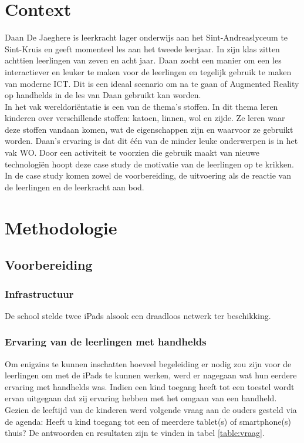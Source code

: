 \documentclass[pdftex,a4paper,12pt,twoside]{report}
\begin{document}
 \section{Context}

Daan De Jaeghere is leerkracht lager onderwijs aan het Sint-Andreaslyceum te Sint-Kruis en geeft momenteel les aan het tweede leerjaar. In zijn klas zitten achttien leerlingen van zeven en acht jaar. Daan zocht een manier om een les interactiever en leuker te maken voor de leerlingen en tegelijk gebruik te maken van moderne ICT. Dit is een ideaal scenario om na te gaan of Augmented Reality op handhelds in de les van Daan gebruikt kan worden. \\

In het vak wereldori\"entatie is een van de thema's stoffen. In dit thema leren kinderen over verschillende stoffen: katoen, linnen, wol en zijde. Ze leren waar deze stoffen vandaan komen, wat de eigenschappen zijn en waarvoor ze gebruikt worden. Daan's ervaring is dat dit \'e\'en van de minder leuke onderwerpen is in het vak WO. Door een activiteit te voorzien die gebruik maakt van nieuwe technologi\"en hoopt deze case study de motivatie van de leerlingen op te krikken. In de case study komen zowel de voorbereiding, de uitvoering als de reactie van de leerlingen en de leerkracht aan bod.\\

\section{Methodologie}

\subsection{Voorbereiding}
\label{sec:voorbereiding}
\subsubsection{Infrastructuur}	
De school stelde twee iPads alsook een draadloos netwerk ter beschikking.

\subsubsection{Ervaring van de leerlingen met handhelds}
Om enigzins te kunnen inschatten hoeveel begeleiding er nodig zou zijn voor de leerlingen om met de iPads te kunnen werken, werd er nagegaan wat hun eerdere ervaring met handhelds was. Indien een kind toegang heeft tot een toestel wordt ervan uitgegaan dat zij ervaring hebben met het omgaan van een handheld. Gezien de leeftijd van de kinderen werd volgende vraag aan de ouders gesteld via de agenda: Heeft u kind toegang tot een of meerdere tablet(s) of smartphone(s) thuis? De antwoorden en resultaten zijn te vinden in tabel \ref{table:vraag}.
\end{document}

